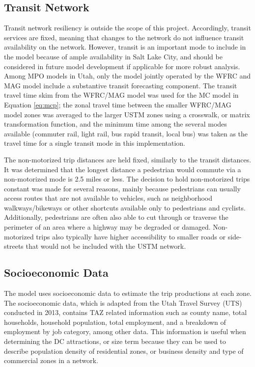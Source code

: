 \subsection{Transit Network}

Transit network resiliency is outside the scope of this project. Accordingly, transit services are fixed, meaning that changes to the
network do not influence transit availability on the network. However, transit
is an important mode to include in the model because of ample availability in Salt Lake City, and should be
considered in future model development if applicable for more robust analysis.
Among MPO models in Utah, only the model jointly operated by the WFRC and MAG model include a
substantive transit forecasting component. The transit travel time skim from the
WFRC/MAG model was used for the MC model in Equation \ref{eq:mcp};
the zonal travel time between the smaller WFRC/MAG model zones was averaged
to the larger USTM zones using a crosswalk, or matrix transformation function, and the minimum time among the several modes available
(commuter rail, light rail, bus rapid transit, local bus) was taken as the travel
time for a single transit mode in this implementation.

The non-motorized trip distances are held fixed, similarly to the transit distances. It was
determined that the longest distance a pedestrian would commute via a non-motorized
mode is 2.5 miles or less. The decision to hold non-motorized
trips constant was made for several reasons, mainly because pedestrians can usually
access routes that are not available to vehicles, such as neighborhood walkways/bikeways
or other shortcuts available only to pedestrians and cyclists. Additionally,
pedestrians are often also able to cut through or traverse the perimeter of an
area where a highway may be degraded or damaged. Non-motorized trips also typically have
higher accessibility to smaller roads or side-streets that would not be included
with the USTM network.

\subsection{Socioeconomic Data}

The model uses socioeconomic data to estimate the trip productions at
each zone. The socioeconomic data, which is adapted from the Utah Travel Survey (UTS) conducted in 2013, contains TAZ related information such
as county name, total households, household population, total employment,
and a breakdown of employment by job category, among other data. This information is useful
when determining the DC attractions, or size term because they can be used to
describe population density of residential zones, or business density and type
of commercial zones in a network.

